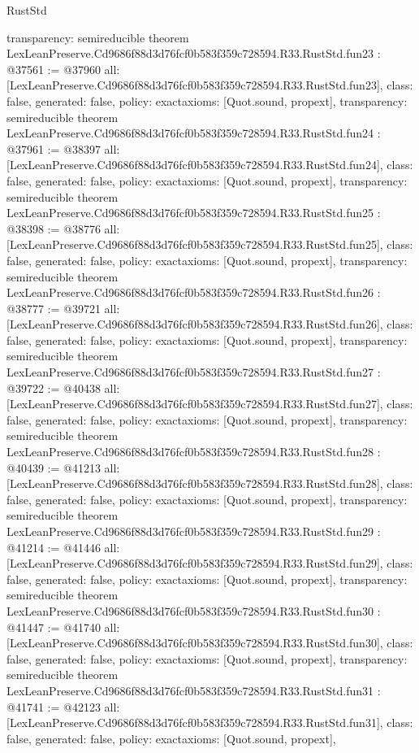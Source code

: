 \begin{lexlean}{RustStd}
\begin{coremodule}
{  transparency: semireducible
}
theorem LexLeanPreserve.Cd9686f88d3d76fcf0b583f359c728594.R33.RustStd.fun23 : @37561 := @37960 {
  all: [LexLeanPreserve.Cd9686f88d3d76fcf0b583f359c728594.R33.RustStd.fun23],
  class: false,
  generated: false,
  policy: exact{axioms: [Quot.sound, propext]},
  transparency: semireducible
}
theorem LexLeanPreserve.Cd9686f88d3d76fcf0b583f359c728594.R33.RustStd.fun24 : @37961 := @38397 {
  all: [LexLeanPreserve.Cd9686f88d3d76fcf0b583f359c728594.R33.RustStd.fun24],
  class: false,
  generated: false,
  policy: exact{axioms: [Quot.sound, propext]},
  transparency: semireducible
}
theorem LexLeanPreserve.Cd9686f88d3d76fcf0b583f359c728594.R33.RustStd.fun25 : @38398 := @38776 {
  all: [LexLeanPreserve.Cd9686f88d3d76fcf0b583f359c728594.R33.RustStd.fun25],
  class: false,
  generated: false,
  policy: exact{axioms: [Quot.sound, propext]},
  transparency: semireducible
}
theorem LexLeanPreserve.Cd9686f88d3d76fcf0b583f359c728594.R33.RustStd.fun26 : @38777 := @39721 {
  all: [LexLeanPreserve.Cd9686f88d3d76fcf0b583f359c728594.R33.RustStd.fun26],
  class: false,
  generated: false,
  policy: exact{axioms: [Quot.sound, propext]},
  transparency: semireducible
}
theorem LexLeanPreserve.Cd9686f88d3d76fcf0b583f359c728594.R33.RustStd.fun27 : @39722 := @40438 {
  all: [LexLeanPreserve.Cd9686f88d3d76fcf0b583f359c728594.R33.RustStd.fun27],
  class: false,
  generated: false,
  policy: exact{axioms: [Quot.sound, propext]},
  transparency: semireducible
}
theorem LexLeanPreserve.Cd9686f88d3d76fcf0b583f359c728594.R33.RustStd.fun28 : @40439 := @41213 {
  all: [LexLeanPreserve.Cd9686f88d3d76fcf0b583f359c728594.R33.RustStd.fun28],
  class: false,
  generated: false,
  policy: exact{axioms: [Quot.sound, propext]},
  transparency: semireducible
}
theorem LexLeanPreserve.Cd9686f88d3d76fcf0b583f359c728594.R33.RustStd.fun29 : @41214 := @41446 {
  all: [LexLeanPreserve.Cd9686f88d3d76fcf0b583f359c728594.R33.RustStd.fun29],
  class: false,
  generated: false,
  policy: exact{axioms: [Quot.sound, propext]},
  transparency: semireducible
}
theorem LexLeanPreserve.Cd9686f88d3d76fcf0b583f359c728594.R33.RustStd.fun30 : @41447 := @41740 {
  all: [LexLeanPreserve.Cd9686f88d3d76fcf0b583f359c728594.R33.RustStd.fun30],
  class: false,
  generated: false,
  policy: exact{axioms: [Quot.sound, propext]},
  transparency: semireducible
}
theorem LexLeanPreserve.Cd9686f88d3d76fcf0b583f359c728594.R33.RustStd.fun31 : @41741 := @42123 {
  all: [LexLeanPreserve.Cd9686f88d3d76fcf0b583f359c728594.R33.RustStd.fun31],
  class: false,
  generated: false,
  policy: exact{axioms: [Quot.sound, propext]},
}
\end{coremodule}
\end{lexlean}
